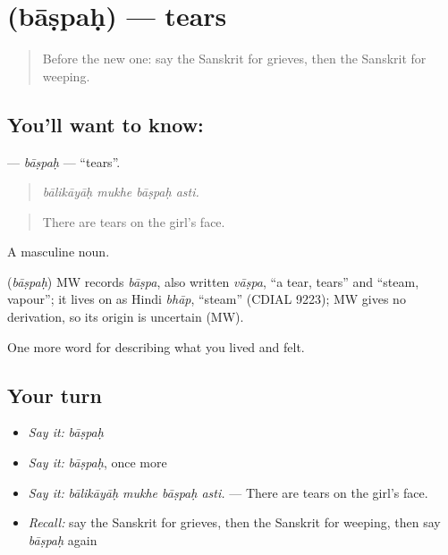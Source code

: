 \section[\texorpdfstring{\sk{बाष्पः} (bāṣpaḥ)}{बाष्पः (bāṣpaḥ)}]{ (bāṣpaḥ) — tears}

\label{lesson:SA-C450-baspah}



\begin{quote}
Before the new one: say the Sanskrit for grieves, then the Sanskrit for weeping.
\end{quote}

\subsection*{You'll want to know: }
\textbf{} — \emph{bāṣpaḥ} — \textquotedblleft{}tears\textquotedblright{}.

\begin{quote}
   
\end{quote}

\begin{quote}
\emph{bālikāyāḥ mukhe bāṣpaḥ asti.}
\end{quote}

\begin{quote}
There are tears on the girl's face.
\end{quote}

A masculine noun.

\begin{cousinweb}
\textbf{} (\emph{bāṣpaḥ}) MW records \emph{bāṣpa}, also written \emph{vāṣpa}, \textquotedblleft{}a tear, tears\textquotedblright{} and \textquotedblleft{}steam, vapour\textquotedblright{}; it lives on as Hindi \emph{bhāp}, \textquotedblleft{}steam\textquotedblright{} (CDIAL 9223); MW gives no derivation, so its origin is uncertain (MW).
\end{cousinweb}

\begin{grammarlens}[title={What you've built}]
One more word for describing what you lived and felt.
\end{grammarlens}

\subsection*{Your turn}
\begin{itemize}
\raggedright
  \item \emph{Say it:} \emph{bāṣpaḥ}
  \item \emph{Say it:} \emph{bāṣpaḥ}, once more
  \item \emph{Say it:} \emph{bālikāyāḥ mukhe bāṣpaḥ asti.} — There are tears on the girl's face.
  \item \emph{Recall:} say the Sanskrit for grieves, then the Sanskrit for weeping, then say \emph{bāṣpaḥ} again
\end{itemize}

